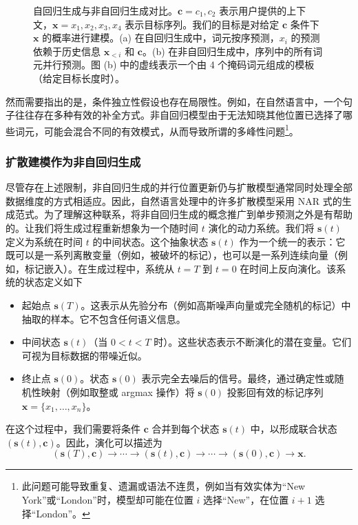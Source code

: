 \begin{figure}[!t]
\centering
{}
\caption{自回归生成与非自回归生成对比。$\mathbf{c} = {c_1,c_2}$ 表示用户提供的上下文，$\mathbf{x}={x_1,x_2,x_3,x_4}$ 表示目标序列。我们的目标是对给定 $\mathbf{c}$ 条件下 $\mathbf{x}$ 的概率进行建模。(a) 在自回归生成中，词元按序预测，$x_i$ 的预测依赖于历史信息 $\mathbf{x}_{<i}$ 和 $\mathbf{c}$。(b) 在非自回归生成中，序列中的所有词元并行预测。图 (b) 中的虚线表示一个由 4 个掩码词元组成的模板（给定目标长度时）。}
\label{fig:ar-vs-nar-generation}
\end{figure}

然而需要指出的是，条件独立性假设也存在局限性。例如，在自然语言中，一个句子往往存在多种有效的补全方式。非自回归模型由于无法知晓其他位置已选择了哪些词元，可能会混合不同的有效模式，从而导致所谓的多峰性问题\footnote{此问题可能导致重复、遗漏或语法不连贯，例如当有效实体为“New York”或“London”时，模型却可能在位置 $i$ 选择“New”，在位置 $i+1$ 选择“London”。}。

\subsubsection{扩散建模作为非自回归生成}

尽管存在上述限制，非自回归生成的并行位置更新仍与扩散模型通常同时处理全部数据维度的方式相适应。因此，自然语言处理中的许多扩散模型采用 NAR 式的生成范式。为了理解这种联系，将非自回归生成的概念推广到单步预测之外是有帮助的。让我们将生成过程重新想象为一个随时间 $t$ 演化的动力系统。我们将 $\mathbf{s}(t)$ 定义为系统在时间 $t$ 的中间状态。这个抽象状态 $\mathbf{s}(t)$ 作为一个统一的表示：它既可以是一系列离散变量（例如，被破坏的标记），也可以是一系列连续向量（例如，标记嵌入）。在生成过程中，系统从 $t=T$ 到 $t=0$ 在时间上反向演化。该系统的状态定义如下

\begin{itemize}
\item 起始点 $\mathbf{s}(T)$。这表示从先验分布（例如高斯噪声向量或完全随机的标记）中抽取的样本。它不包含任何语义信息。
\item 中间状态 $\mathbf{s}(t)$（当 $0 < t < T$ 时）。这些状态表示不断演化的潜在变量。它们可视为目标数据的带噪近似。
\item 终止点 $\mathbf{s}(0)$。状态 $\mathbf{s}(0)$ 表示完全去噪后的信号。最终，通过确定性或随机性映射（例如取整或 argmax 操作）将 $\mathbf{s}(0)$ 投影回有效的标记序列 $\mathbf{x} = \{x_1, \dots, x_n\}$。
\end{itemize}

在这个过程中，我们需要将条件 $\mathbf{c}$ 合并到每个状态 $\mathbf{s}(t)$ 中，以形成联合状态 $(\mathbf{s}(t), \mathbf{c})$。因此，演化可以描述为
\begin{equation}
(\mathbf{s}(T), \mathbf{c}) \to \cdots \to (\mathbf{s}(t), \mathbf{c}) \to \cdots \to (\mathbf{s}(0), \mathbf{c}) \to \mathbf{x}.
\end{equation}

